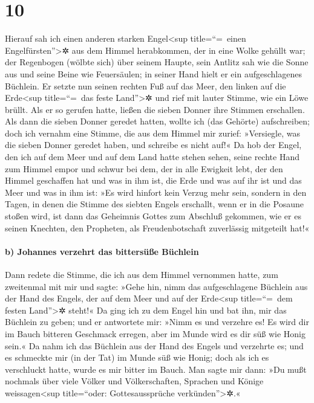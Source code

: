 \hypertarget{section-9}{%
\section{10}\label{section-9}}

 Hierauf sah ich einen anderen starken Engel\textless sup
title=``=~einen Engelfürsten''\textgreater✲ aus dem Himmel herabkommen,
der in eine Wolke gehüllt war; der Regenbogen (wölbte sich) über seinem
Haupte, sein Antlitz sah wie die Sonne aus und seine Beine wie
Feuersäulen;  in seiner Hand hielt er ein aufgeschlagenes
Büchlein. Er setzte nun seinen rechten Fuß auf das Meer, den linken auf
die Erde\textless sup title=``=~das feste Land''\textgreater✲
 und rief mit lauter Stimme, wie ein Löwe brüllt. Als er
so gerufen hatte, ließen die sieben Donner ihre Stimmen erschallen.
 Als dann die sieben Donner geredet hatten, wollte ich
(das Gehörte) aufschreiben; doch ich vernahm eine Stimme, die aus dem
Himmel mir zurief: »Versiegle, was die sieben Donner geredet haben, und
schreibe es nicht auf!«  Da hob der Engel, den ich auf dem
Meer und auf dem Land hatte stehen sehen, seine rechte Hand zum Himmel
empor  und schwur bei dem, der in alle Ewigkeit lebt, der
den Himmel geschaffen hat und was in ihm ist, die Erde und was auf ihr
ist und das Meer und was in ihm ist: »Es wird hinfort kein Verzug mehr
sein,  sondern in den Tagen, in denen die Stimme des
siebten Engels erschallt, wenn er in die Posaune stoßen wird, ist dann
das Geheimnis Gottes zum Abschluß gekommen, wie er es seinen Knechten,
den Propheten, als Freudenbotschaft zuverlässig mitgeteilt hat!«

\hypertarget{b-johannes-verzehrt-das-bittersuxfcuxdfe-buxfcchlein}{%
\paragraph{b) Johannes verzehrt das bittersüße
Büchlein}\label{b-johannes-verzehrt-das-bittersuxfcuxdfe-buxfcchlein}}

 Dann redete die Stimme, die ich aus dem Himmel vernommen
hatte, zum zweitenmal mit mir und sagte: »Gehe hin, nimm das
aufgeschlagene Büchlein aus der Hand des Engels, der auf dem Meer und
auf der Erde\textless sup title=``=~dem festen Land''\textgreater✲
steht!«  Da ging ich zu dem Engel hin und bat ihn, mir das
Büchlein zu geben; und er antwortete mir: »Nimm es und verzehre es! Es
wird dir im Bauch bitteren Geschmack erregen, aber im Munde wird es dir
süß wie Honig sein.«  Da nahm ich das Büchlein aus der
Hand des Engels und verzehrte es; und es schmeckte mir (in der Tat) im
Munde süß wie Honig; doch als ich es verschluckt hatte, wurde es mir
bitter im Bauch.  Man sagte mir dann: »Du mußt nochmals
über viele Völker und Völkerschaften, Sprachen und Könige
weissagen\textless sup title=``oder: Gottesaussprüche
verkünden''\textgreater✲.«

